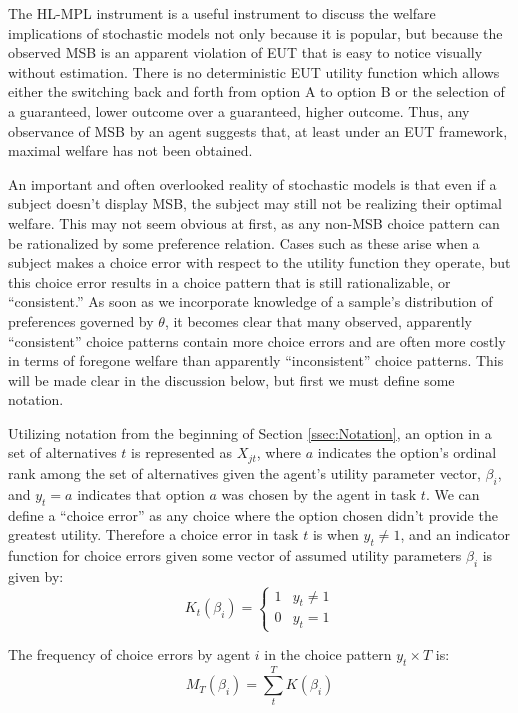 \documentclass[../main.tex]{subfiles}
\begin{document}
The HL-MPL instrument is a useful instrument to discuss the welfare implications of stochastic models not only because it is popular, but because the observed MSB is an apparent violation of EUT that is easy to notice visually without estimation.
There is no deterministic EUT utility function which allows either the switching back and forth from option A to option B or the selection of a guaranteed, lower outcome over a guaranteed, higher outcome.
Thus, any observance of MSB by an agent suggests that, at least under an EUT framework, maximal welfare has not been obtained.

An important and often overlooked reality of stochastic models is that even if a subject doesn't display MSB, the subject may still not be realizing their optimal welfare.
This may not seem obvious at first, as any non-MSB choice pattern can be rationalized by some preference relation.
Cases such as these arise when a subject makes a choice error with respect to the utility function they operate, but this choice error results in a choice pattern that is still rationalizable, or \enquote{consistent.}
As soon as we incorporate knowledge of a sample's distribution of preferences governed by $\theta$, it becomes clear that many observed, apparently \enquote{consistent} choice patterns contain more choice errors and are often more costly in terms of foregone welfare than apparently \enquote{inconsistent} choice patterns.
This will be made clear in the discussion below, but first we must define some notation.

Utilizing notation from the beginning of Section \ref{ssec:Notation}, an option in a set of alternatives $t$ is represented as $X_{jt}$, where $a$ indicates the option's ordinal rank among the set of alternatives given the agent's utility parameter vector, $\beta_i$, and $y_t = a$ indicates that option $a$ was chosen by the agent in task $t$.
We can define a \enquote{choice error} as any choice where the option chosen didn't provide the greatest utility.
Therefore a choice error in task $t$ is when $y_t \neq 1$, and an indicator function for choice errors given some vector of assumed utility parameters $\beta_i$ is given by:
\begin{equation}
	\label{eq3:Itb}
	K_{t}(\beta_i) =
	\begin{cases}
		 1 & y_t \neq 1\\
		 0 & y_t = 1
	\end{cases}
\end{equation}

\noindent The frequency of choice errors by agent $i$ in the choice pattern $y_t \times T$ is:
\begin{equation}
	\label{eq3:MTBn}
	M_T(\beta_i) = \sum_t^T K(\beta_i)
\end{equation}
\end{document}
